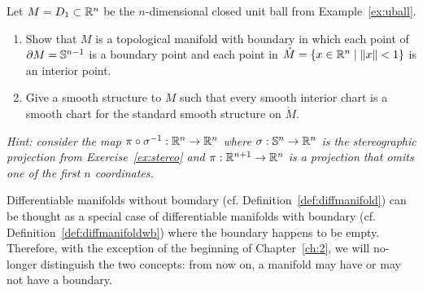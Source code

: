 \begin{exercise}
  Let $M = D_1\subset \mathbb{R}^n$ be the $n$-dimensional closed unit ball from Example~\ref{ex:uball}.
  \begin{enumerate}
    \item Show that $M$ is a topological manifold with boundary in which each point of $\partial M = \mathbb{S}^{n-1}$ is a boundary point and each point in $\mathring M = \{x\in\mathbb{R}^n\mid\|x\|<1\}$ is an interior point.
    \item Give a smooth structure to $M$ such that every smooth interior chart is a smooth chart for the standard smooth structure on $\mathring M$.
  \end{enumerate}
  \textit{\small Hint: consider the map $\pi\circ\sigma^{-1}:\mathbb{R}^n\to\mathbb{R}^n$ where $\sigma:\mathbb{S}^n\to\mathbb{R}^n$ is the stereographic projection from Exercise~\ref{ex:stereo} and $\pi:\mathbb{R}^{n+1}\to\mathbb{R}^n$ is a projection that omits one of the first $n$ coordinates.}
\end{exercise}

\begin{tcolorbox}
  Differentiable manifolds without boundary (cf. Definition~\ref{def:diffmanifold}) can be thought as a special case of differentiable manifolds with boundary (cf. Definition~\ref{def:diffmanifoldwb}) where the boundary happens to be empty.
  Therefore, with the exception of the beginning of Chapter~\ref{ch:2}, we will no-longer distinguish the two concepts: from now on, a manifold may have or may not have a boundary.
\end{tcolorbox}
